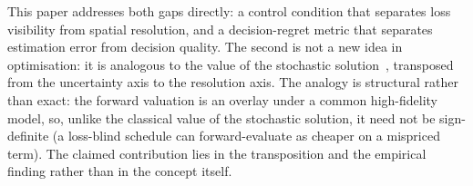 This paper addresses both gaps directly: a control condition that separates loss
visibility from spatial resolution, and a decision-regret metric that separates
estimation error from decision quality. The second is not a new idea in optimisation:
it is analogous to the value of the stochastic solution~\citep{BirgeLouveaux2011}, transposed
from the uncertainty axis to the resolution axis. The analogy is structural rather than exact:
the forward valuation is an overlay under a common high-fidelity model, so, unlike the classical
value of the stochastic solution, it need not be sign-definite (a loss-blind schedule can
forward-evaluate as cheaper on a mispriced term). The claimed contribution lies in the
transposition and the empirical finding rather than in the concept itself.

